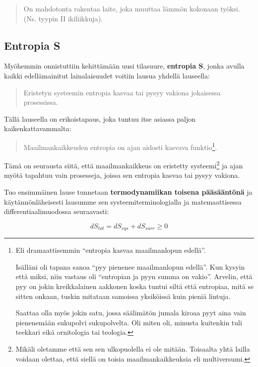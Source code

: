\documentclass[12pt,a4paper,finnish]{book}
\begin{document}
\begin{quote}
 On mahdotonta rakentaa laite, joka muuttaa lämmön kokonaan työksi. (Ns. tyypin II ikiliikkuja).
\end{quote}

\subsection{Entropia S}

Myöhemmin onnistuttiin kehittämään uusi tilasuure, \textbf{entropia S}, jonka avulla kaikki
edellämainitut lainalaisuudet voitiin lausua yhdellä lauseella:

\begin{quote}
 Eristetyn systeemin entropia kasvaa tai pysyy vakiona jokaisessa prosessissa.
\end{quote}

Tällä lauseella on erikoistapaus, joka tuntuu itse asiassa paljon kaikenkattavammalta:

\begin{quote}
 Maailmankaikkeuden entropia on ajan aidosti kasvava funktio\footnote{Eli dramaattisemmin ``entropia 
 kasvaa maailmanlopun edellä''. 
 
 Isälläni oli tapana sanoa ``pyy pienenee maailmanlopun 
 edellä''. Kun kysyin että miksi, niin vastaus oli ``entropian ja pyyn summa on vakio''. Arvelin, että 
 pyy on jokin kreikkalainen aakkonen koska tuntui siltä että entropiaa, mitä se sitten onkaan, tuskin 
 mitataan samoissa yksiköissä kuin pieniä lintuja. 
 
 Saattaa olla myös jokin satu, jossa säälimätön jumala kiroaa pyyt aina vain pienenemään sukupolvi 
 sukupolvelta. Oli miten oli, minusta kuitenkin tuli teekkari eikä ornitologia tai teologia.}.
\end{quote}

Tämä on seurausta siitä, että maailmankaikkeus on eristetty systeemi\footnote{Mikäli oletamme että sen 
sen ulkopuolella ei ole mitään. Toisaalta yhtä lailla voidaan olettaa, että siellä on toisia maailmankaikkeuksia 
eli multiversumi.} ja ajan myötä tapahtuu vain prosesseja, joissa sen entropia kasvaa tai pysyy vakiona.

Tuo ensimmäinen lause tunnetaan \textbf{termodynamiikan toisena pääsääntönä} ja käytännönläheisesti 
lausumme sen systeemiterminologialla ja matemaattisessa differentiaalimuodossa seuraavasti:

\begin{equation}
\label{eqn:psII}
 dS_{tot} = dS_{sys} + dS_{surr} \geq 0
\end{equation}
\end{document}

